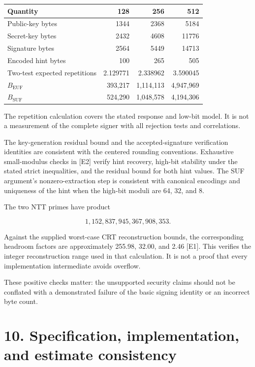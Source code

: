 \documentclass[
  american,
  10pt,
  a4paper,
]{article}
\newcounter{none} %
\begin{document}
{\def\LTcaptype{none} %
\begin{longtable}[]{@{}lrrr@{}}
\toprule\noalign{}
Quantity & 128 & 256 & 512 \\
\midrule\noalign{}
\endhead
\bottomrule\noalign{}
\endlastfoot
Public-key bytes & 1344 & 2368 & 5184 \\
Secret-key bytes & 2432 & 4608 & 11776 \\
Signature bytes & 2564 & 5449 & 14713 \\
Encoded hint bytes & 100 & 265 & 505 \\
Two-test expected repetitions & 2.129771 & 2.338962 & 3.590045 \\
\(B_{\mathrm{EUF}}\) & 393,217 & 1,114,113 & 4,947,969 \\
\(B_{\mathrm{SUF}}\) & 524,290 & 1,048,578 & 4,194,306 \\
\end{longtable}
}

The repetition calculation covers the stated response and low-bit model.
It is not a measurement of the complete signer with all rejection tests
and correlations.

The key-generation residual bound and the accepted-signature
verification identities are consistent with the centered rounding
conventions. Exhaustive small-modulus checks in {[}E2{]} verify hint
recovery, high-bit stability under the stated strict inequalities, and
the residual bound for both hint values. The SUF argument's
nonzero-extraction step is consistent with canonical encodings and
uniqueness of the hint when the high-bit moduli are 64, 32, and 8.

The two NTT primes have product

\[
1,152,837,945,367,908,353.
\]

Against the supplied worst-case CRT reconstruction bounds, the
corresponding headroom factors are approximately 255.98, 32.00, and 2.46
{[}E1{]}. This verifies the integer reconstruction range used in that
calculation. It is not a proof that every implementation intermediate
avoids overflow.

These positive checks matter: the unsupported security claims should not
be conflated with a demonstrated failure of the basic signing identity
or an incorrect byte count.

\section{10. Specification, implementation, and estimate
consistency}\label{specification-implementation-and-estimate-consistency}
\end{document}
